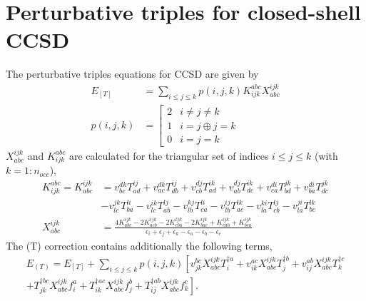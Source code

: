 \documentclass[a4paper,12pt,oneside]{book}
\begin{document}
\section{Perturbative triples for closed-shell CCSD}
The perturbative triples equations for CCSD are given by
\begin{equation}
\begin{aligned}
E_{[T]} &= \sum_{i\le j\le k}p(i,j,k) K^{abc}_{ijk} X_{abc}^{ijk}\\
p(i,j,k) &= \left[\begin{matrix}
  2 & i\ne j\ne k\\
  1 & i=j \oplus j=k\\
  0 & i=j=k
\end{matrix}\right.
\end{aligned}
\end{equation}
$X_{abc}^{ijk}$ and $K^{abc}_{ijk}$ are calculated for the triangular set of indices $i\le j\le k$
(with $k=1:n_{occ}$),
\begin{equation}
\begin{aligned}
K^{abc}_{ijk} = K_{abc}^{ijk} &= v_{bc}^{dk} T^{ij}_{ad} + v_{ac}^{dk} T^{ij}_{db} + v_{cb}^{dj} T^{ik}_{ad} 
+ v_{ab}^{dj} T^{ik}_{dc} + v_{ca}^{di} T^{jk}_{bd} + v_{ba}^{di} T^{jk}_{dc} \\
&- v_{lc}^{jk} T^{li}_{ba} - v_{lc}^{ik} T^{lj}_{ab} - v_{lb}^{kj} T^{li}_{ca} 
- v_{lb}^{ij} T^{lk}_{ac} - v_{la}^{ki} T^{lj}_{cb} - v_{la}^{ji} T^{lk}_{bc} \\
X_{abc}^{ijk} &= \frac{4K_{abc}^{ijk} - 2K_{acb}^{ijk} - 2K_{cba}^{ijk} - 2K_{bac}^{ijk} 
+ K_{cab}^{ijk} + K_{bca}^{ijk}}{\epsilon_i +\epsilon_j +\epsilon_k -\epsilon_a -\epsilon_b -\epsilon_c}
\end{aligned}
\end{equation}
The (T) correction contains additionally the following terms,
\begin{equation}
\begin{aligned}
\label{eq:Eccsd(t)}
E_{(T)}=E_{[T]} + \sum_{i\le j\le k}p(i,j,k) \left[
  v_{jk}^{bc} X_{abc}^{ijk} T_{i}^{\dagger a} + v_{ik}^{ac} X_{abc}^{ijk} T_{j}^{\dagger b}
+ v_{ij}^{ab} X_{abc}^{ijk} T_{k}^{\dagger c} \right.\\
\left.
  + T_{jk}^{\dagger bc} X_{abc}^{ijk} f_i^a + T_{ik}^{\dagger ac} X_{abc}^{ijk} f_j^b
+ T_{ij}^{\dagger ab} X_{abc}^{ijk} f_k^c \right].
\end{aligned}
\end{equation}
\end{document}
